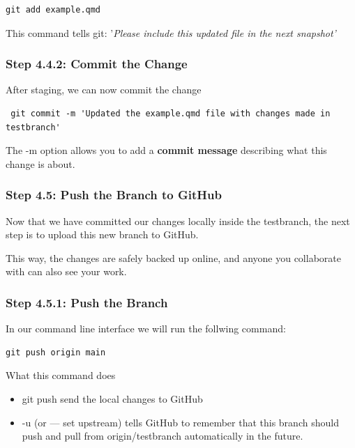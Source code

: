 \documentclass[
  11pt,
  a4paper,
]{article}
\begin{document}
\begin{verbatim}
git add example.qmd
\end{verbatim}

This command tells git: '\emph{Please include this updated file in the
next snapshot'}

\subsubsection{Step 4.4.2: Commit the
Change}\label{step-4.4.2-commit-the-change}

After staging, we can now commit the change

\begin{verbatim}
 git commit -m 'Updated the example.qmd file with changes made in testbranch'
\end{verbatim}

The -m option allows you to add a \textbf{commit message} describing
what this change is about.

\subsubsection{Step 4.5: Push the Branch to
GitHub}\label{step-4.5-push-the-branch-to-github}

Now that we have committed our changes locally inside the testbranch,
the next step is to upload this new branch to GitHub.

This way, the changes are safely backed up online, and anyone you
collaborate with can also see your work.

\subsubsection{Step 4.5.1: Push the
Branch}\label{step-4.5.1-push-the-branch}

In our command line interface we will run the follwing command:

\begin{verbatim}
git push origin main 
\end{verbatim}

What this command does

\begin{itemize}
\item
  git push send the local changes to GitHub
\item
  -u (or --- set upstream) tells GitHub to remember that this branch
  should push and pull from origin/testbranch automatically in the
  future.
\end{itemize}
\end{document}
